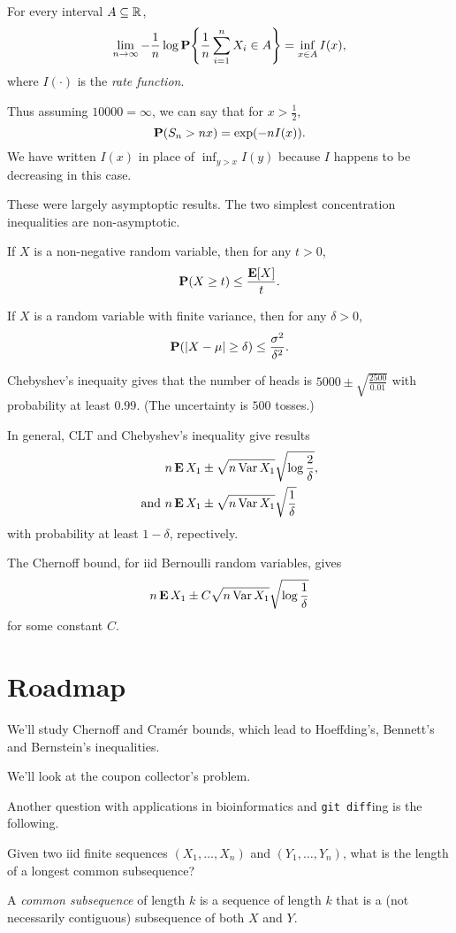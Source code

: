 \begin{theorem} \label{thm:ldev}
    For every interval $A \subseteq \R$, \[
        \lim_{n \to \infty} -\frac1n \log \P\set*{\frac1n \sum_{i=1}^n X_i \in A}
            = \inf_{x \in A} I(x),
    \] where $I(\cdot)$ is the \emph{rate function}.
\end{theorem}
Thus assuming $10000 = \infty$, we can say that for $x > \frac12$, \[
    \P(S_n > n x) = \exp(-n I(x)).
\] We have written $I(x)$ in place of $\inf_{y > x} I(y)$ because $I$
happens to be decreasing in this case.

These were largely asymptoptic results.
The two simplest concentration inequalities are non-asymptotic.
\begin{theorem} \label{thm:markov}
    If $X$ is a non-negative random variable, then for any $t > 0$, \[
        \P(X \ge t) \le \frac{\E[X]}{t}.
    \]
\end{theorem}
\begin{theorem} \label{thm:cheby}
    If $X$ is a random variable with finite variance,
    then for any $\delta > 0$, \[
        \P(\abs{X - \mu} \ge \delta) \le \frac{\sigma^2}{\delta^2}.
    \]
\end{theorem}
Chebyshev's inequaity gives that the number of heads is
$5000 \pm \sqrt{\frac{2500}{0.01}}$ with probability at least $0.99$.
(The uncertainty is $500$ tosses.)

In general, CLT and Chebyshev's inequality give results \begin{align*}
    &n \E X_1 \pm \sqrt{n \Var X_1} \sqrt{\log \frac2\delta}, \\
    \text{and } &n \E X_1 \pm \sqrt{n \Var X_1} \sqrt{\frac1\delta}
\end{align*}
with probability at least $1 - \delta$, repectively.

The Chernoff bound, for iid Bernoulli random variables, gives \[
    n \E X_1 \pm C \sqrt{n \Var X_1} \sqrt{\log \frac1\delta}
\] for some constant $C$.

\section*{Roadmap}
We'll study Chernoff and Cram\'er bounds, which lead to Hoeffding's,
Bennett's and Bernstein's inequalities.

We'll look at the coupon collector's problem.

Another question with applications in bioinformatics and
\texttt{git diff}ing is the following.
\begin{question}
    Given two iid finite sequences $(X_1, \dots, X_n)$ and
    $(Y_1, \dots, Y_n)$, what is the length of a longest common subsequence?

    A \emph{common subsequence} of length $k$ is a sequence of length $k$
    that is a (not necessarily contiguous) subsequence of both $X$ and $Y$.
\end{question}

